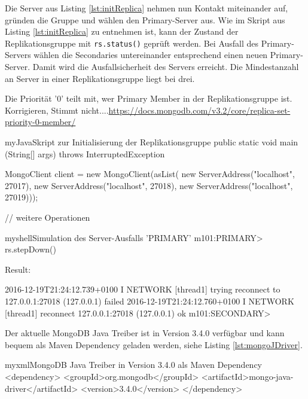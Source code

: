 Die Server aus Listing \ref{lst:initReplica} nehmen nun Kontakt miteinander auf, gründen die Gruppe und wählen den Primary-Server aus. Wie im Skript aus Listing 	\ref{lst:initReplica} zu entnehmen ist, kann der Zustand der Replikationsgruppe mit \texttt{rs.status()} geprüft werden. Bei Ausfall des Primary-Servers wählen die Secondaries untereinander entsprechend einen neuen Primary-Server. Damit wird die Ausfallsicherheit des Servers erreicht. Die Mindestanzahl an Server in einer Replikationsgruppe liegt bei drei. 


Die Priorität '0' teilt mit, wer Primary Member in der Replikationsgruppe ist. Korrigieren, Stimmt nicht....\url{https://docs.mongodb.com/v3.2/core/replica-set-priority-0-member/}

\begin{listingsboxJava}[label={lst:X}]{myJava}{Skript zur Initialisierung der Replikationsgruppe}
public static void main (String[] args) throws InterruptedException {
        MongoClient client = new MongoClient(asList(
                new ServerAddress("localhost", 27017),
                new ServerAddress("localhost", 27018),
                new ServerAddress("localhost", 27019)));
                
                // weitere Operationen
}
\end{listingsboxJava}

\begin{listingsboxShell}[label={lst:X}]{myshell}{Simulation des Server-Ausfalls 'PRIMARY'}
m101:PRIMARY> rs.stepDown()

Result:

2016-12-19T21:24:12.739+0100 I NETWORK  [thread1]
trying reconnect to 127.0.0.1:27018 (127.0.0.1) failed
2016-12-19T21:24:12.760+0100 I NETWORK  [thread1]
reconnect 127.0.0.1:27018 (127.0.0.1) ok
m101:SECONDARY> 
\end{listingsboxShell}

Der aktuelle MongoDB Java Treiber ist in Version 3.4.0 verfügbar und kann bequem als Maven Dependency geladen werden, siehe Listing  \ref{lst:mongoJDriver}.
 
\begin{listingsboxJava}[label={lst:mongoJDriver}]{myxml}{MongoDB Java Treiber in Version 3.4.0 als Maven Dependency}
<dependency>
        <groupId>org.mongodb</groupId>
        <artifactId>mongo-java-driver</artifactId>
        <version>3.4.0</version>
</dependency>
\end{listingsboxJava}




